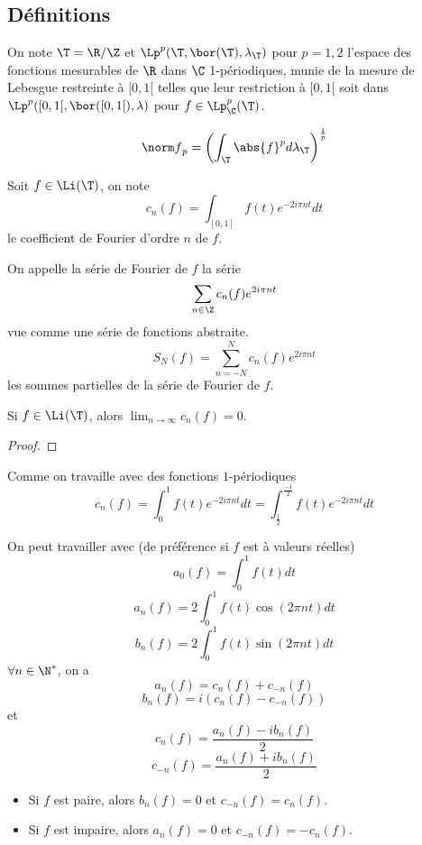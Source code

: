 \subsection{Définitions}


\begin{definition}
	On note $\T = \R / \Z$ et $\Lp^p(\T, \bor (\T), \lambda_{\T})$ pour $p = 1,2$ l'espace des fonctions mesurables de $\R$ dans $\C$ 1-périodiques, munie de la mesure de Lebesgue restreinte à $[0,1[$
	telles que leur restriction à $[0,1[$ soit dans $\Lp^p([0,1[, \bor([0,1[), \lambda)$ pour $f \in \Lp_{\C}^p(\T)$.

	$$ {\norm f}_p = \left( \int_{\T} \abs{f}^p d\lambda_{\T} \right)^{\frac{1}{p}} $$
\end{definition}

\begin{definition}
	Soit $f \in \Li(\T)$, on note
	$$ c_n(f) = \int_{[0,1]} f(t) e^{-2i\pi nt} dt $$
	le coefficient de Fourier d'ordre $n$ de $f$.

	On appelle la série de Fourier de $f$ la série
	$$ \sum_{n \in \Z} c_n(f) e^{2i\pi nt} $$
	vue comme une série de fonctions abstraite.
	$$ S_N(f) = \sum_{n = -N}^{N} c_n(f) e^{2i\pi nt} $$
	les sommes partielles de la série de Fourier de $f$.
\end{definition}

\begin{prop}
	Si $f \in \Li(\T)$, alors $\lim_{n \to \infty} c_n(f) = 0$.
\end{prop}

\begin{proof}
\end{proof}

\begin{remarque}
	Comme on travaille avec des fonctions $1$-périodiques
	$$ c_n(f) = \int_0^1 f(t) e^{-2i\pi nt} dt  = \int_{\frac{1}{2}}^{\frac{-1}{2}} f(t) e^{-2i\pi nt} dt $$
\end{remarque}



\begin{definition}
	On peut travailler avec (de préférence si $f$ est à valeurs réelles)
	$$ a_0(f) = \int_0^1 f(t) dt $$
	$$ a_n(f) = 2\int_0^1 f(t) \cos(2\pi nt) dt $$
	$$ b_n(f) = 2\int_0^1 f(t) \sin(2\pi nt) dt $$
	$\forall n \in \N^*$, on a
	$$ a_n(f) = c_n(f) + c_{-n}(f) $$
	$$ b_n(f) = i(c_n(f) - c_{-n}(f)) $$
	et
	$$ c_n(f) = \frac{a_n(f) - ib_n(f)}{2} $$
	$$ c_{-n}(f) = \frac{a_n(f) + ib_n(f)}{2} $$
\end{definition}


\begin{prop}[Parité]
	\begin{itemize}
		\item Si $f$ est paire, alors $b_n(f) = 0$ et $c_{-n}(f) = c_n(f)$.
		\item Si $f$ est impaire, alors $a_n(f) = 0$ et $c_{-n}(f) = -c_n(f)$.
	\end{itemize}
\end{prop}
